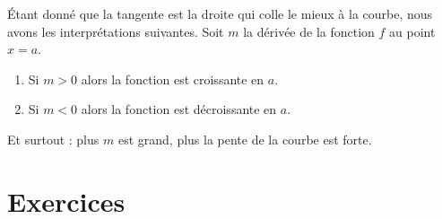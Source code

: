 Étant donné que la tangente est la droite qui colle le mieux à la courbe, nous avons les interprétations suivantes. Soit \( m\) la dérivée de la fonction \( f\) au point \( x=a\).
\begin{enumerate}
    \item
        Si \( m>0\) alors la fonction est croissante en \( a\).
    \item
        Si \( m<0\) alors la fonction est décroissante en \( a\).
\end{enumerate}
Et surtout : plus \( m\) est grand, plus la pente de la courbe est forte.

\section{Exercices}

